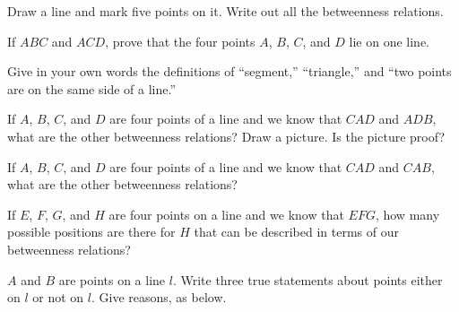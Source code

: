 \documentclass[11pt]{book}
\theoremstyle{bkplain}
\theoremstyle{XIplainnote}
\theoremstyle{bkplain}
\theoremstyle{bkplain}
\begin{document}
\begin{exercisecols}
\begin{exlist}
\item Draw a line and mark five points on it. Write out all the betweenness
      relations.
\item If $ABC$ and $ACD$, prove that the four points $A$, $B$, $C$, and $D$ lie
      on one line.
\item Give in your own words the definitions of ``segment,'' ``triangle,'' and
      ``two points are on the same side of a line.''
\item If $A$, $B$, $C$, and $D$ are four points of a line and we know that $CAD$
      and $ADB$, what are the other betweenness relations? Draw a picture. Is the
      picture proof?
\item[\stex 5.] If $A$, $B$, $C$, and $D$ are four points of a line and we know
      that $CAD$ and $CAB$, what are the other betweenness relations?
\item[6.] If $E$, $F$, $G$, and $H$ are four points on a line and we know that
      $EFG$, how many possible positions are there for $H$ that can be described
      in terms of our betweenness relations?
\end{exlist}

\begin{exlist}[start=7]
\item $A$ and $B$ are points on a line $l$. Write three true statements about
      points either on $l$ or not on $l$. Give reasons, as below.
\end{exlist}

\begin{steps}
\step{\rule{0.92\linewidth}{0.4pt}}{\rule{0.92\linewidth}{0.4pt}}
\step{\rule{0.92\linewidth}{0.4pt}}{\rule{0.92\linewidth}{0.4pt}}
\step{\rule{0.92\linewidth}{0.4pt}}{\rule{0.92\linewidth}{0.4pt}}
\end{steps}


\end{exercisecols}
\end{document}
